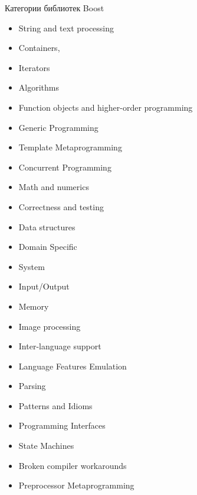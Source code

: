 \documentclass{beamer}
\begin{document}
\begin{frame}[fragile]{Категории библиотек Boost}
\medskip
    \fontsize{10pt}{0.8em}\selectfont
    \begin{minipage}{.5\textwidth}

\begin{itemize}
    \item String and text processing
    \item Containers, 
    \item Iterators
    \item Algorithms
    \item Function objects and higher-order programming
    \item Generic Programming
    \item Template Metaprogramming
    \item Concurrent Programming
    \item Math and numerics
    \item Correctness and testing
    \item Data structures
    \item Domain Specific
    \item System
    \end{itemize}
\end{minipage}%
\begin{minipage}{.45\textwidth}
\begin{itemize}
    \item Input/Output
    \item Memory
    \item Image processing
    \item Inter-language support
    \item Language Features Emulation
    \item Parsing
    \item Patterns and Idioms
    \item Programming Interfaces
    \item State Machines
    \item Broken compiler workarounds
    \item Preprocessor Metaprogramming
\end{itemize}
\end{minipage}%
\end{frame}
\end{document}
